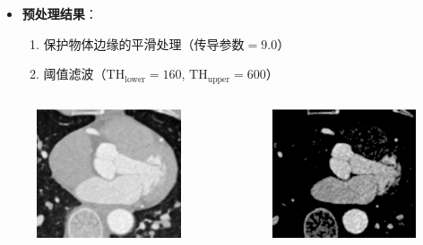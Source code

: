 \begin{frame}
\begin{itemize}
  \item \textbf{预处理结果}：
  \begin{enumerate}
    \pause \item 保护物体边缘的平滑处理（$\text{传导参数} = 9.0$）
    \pause \item 阈值滤波（$\text{TH}_{\text{lower}} = 160$, $\text{TH}_{\text{upper}} = 600$）
  \end{enumerate}
\end{itemize}
\begin{columns}[b,onlytextwidth]
\begin{column}{.5\textwidth}
\pause \begin{figure}
\centering
\includegraphics[height=1.5in]{../../Figures/coronary/smooth.eps}
\end{figure}
\end{column}
\begin{column}{.5\textwidth}
\pause \begin{figure}
\centering
\includegraphics[height=1.5in]{../../Figures/coronary/threshold.eps}
\end{figure}
\end{column}
\end{columns}
\end{frame}

